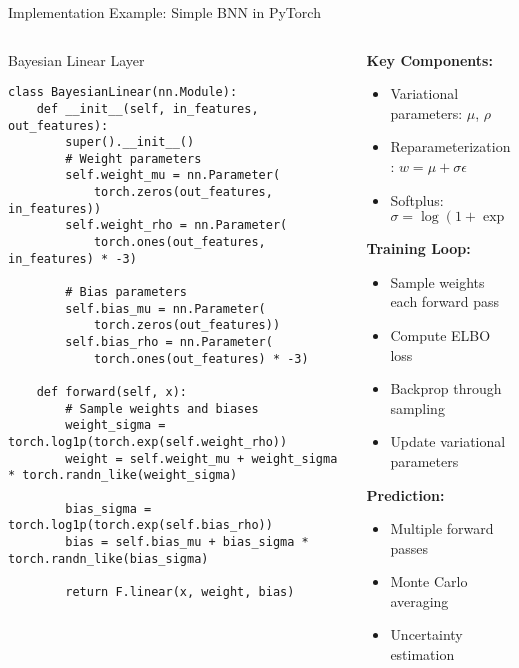 \documentclass[aspectratio=169,11pt]{beamer}
\begin{document}
\begin{frame}[fragile]{Implementation Example: Simple BNN in PyTorch}
\begin{columns}
\begin{column}{0.55\textwidth}
\begin{block}{Bayesian Linear Layer}
\begin{verbatim}
class BayesianLinear(nn.Module):
    def __init__(self, in_features, out_features):
        super().__init__()
        # Weight parameters
        self.weight_mu = nn.Parameter(
            torch.zeros(out_features, in_features))
        self.weight_rho = nn.Parameter(
            torch.ones(out_features, in_features) * -3)
        
        # Bias parameters  
        self.bias_mu = nn.Parameter(
            torch.zeros(out_features))
        self.bias_rho = nn.Parameter(
            torch.ones(out_features) * -3)
    
    def forward(self, x):
        # Sample weights and biases
        weight_sigma = torch.log1p(torch.exp(self.weight_rho))
        weight = self.weight_mu + weight_sigma * torch.randn_like(weight_sigma)
        
        bias_sigma = torch.log1p(torch.exp(self.bias_rho))
        bias = self.bias_mu + bias_sigma * torch.randn_like(bias_sigma)
        
        return F.linear(x, weight, bias)
\end{verbatim}
\end{block}
\end{column}
\begin{column}{0.45\textwidth}
\textbf{Key Components:}
\begin{itemize}
\item \textcolor{forest}{Variational parameters:} $\mu$, $\rho$
\item \textcolor{forest}{Reparameterization:} $w = \mu + \sigma \epsilon$
\item \textcolor{forest}{Softplus:} $\sigma = \log(1 + \exp(\rho))$
\end{itemize}

\vspace{0.3cm}
\textbf{Training Loop:}
\begin{itemize}
\item Sample weights each forward pass
\item Compute ELBO loss
\item Backprop through sampling
\item Update variational parameters
\end{itemize}

\vspace{0.3cm}
\textbf{Prediction:}
\begin{itemize}
\item Multiple forward passes
\item Monte Carlo averaging
\item Uncertainty estimation
\end{itemize}
\end{column}
\end{columns}
\end{frame}
\end{document}
